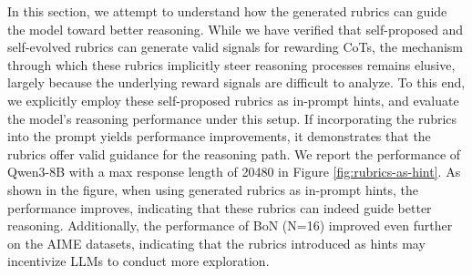 In this section, we attempt to understand how the generated rubrics can guide the model toward better reasoning. 
While we have verified that self-proposed and self-evolved rubrics can generate valid signals for rewarding CoTs, the mechanism through which these rubrics implicitly steer reasoning processes remains elusive, largely because the underlying reward signals are difficult to analyze.
To this end, we explicitly employ these self-proposed rubrics as in-prompt hints, and evaluate the model’s reasoning performance under this setup. 
If incorporating the rubrics into the prompt yields performance improvements, it demonstrates that the rubrics offer valid guidance for the reasoning path. 
We report the performance of Qwen3-8B with a max response length of 20480 in Figure \ref{fig:rubrics-as-hint}. 
As shown in the figure, when using generated rubrics as in-prompt hints, the performance improves, indicating that these rubrics can indeed guide better reasoning. 
Additionally, the performance of BoN (N=16) improved even further on the AIME datasets, indicating that the rubrics introduced as hints may incentivize LLMs to conduct more exploration. 


\renewcommand{\arraystretch}{0.9}
